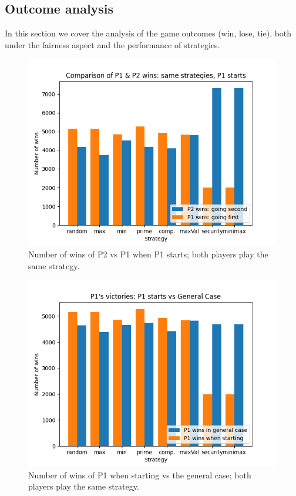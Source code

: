 \subsection{Outcome analysis} \label{subsection: Outcomes}

In this section we cover the analysis of the game outcomes (win, lose, tie), both under the fairness aspect and the performance of strategies.

\begin{figure}
	\centering
	\includegraphics[width=1\linewidth]{img/histogram_p1vsp2_p1first.png}
	\caption{Number of wins of P2 vs P1 when P1 starts; both players play the same strategy.}
	\label{fig:hist_p1vsp2_p1first}
\end{figure}

\begin{figure}
	\centering
	\includegraphics[width=1\linewidth]{img/histogram_p1wins_2cases.png}
	\caption{Number of wins of P1 when starting vs the general case; both players play the same strategy.}
	\label{fig:hist_p1wins_2cases}
\end{figure}

